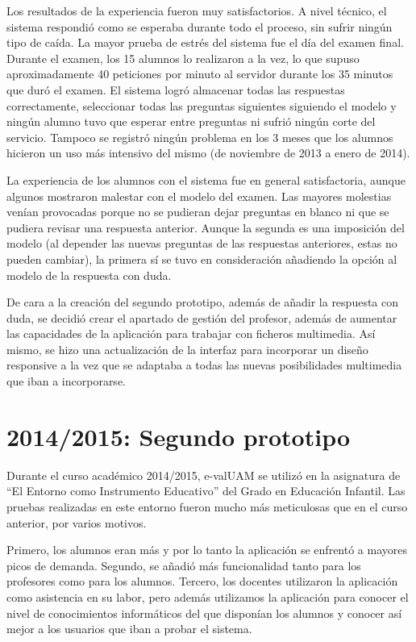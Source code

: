 Los resultados de la experiencia fueron muy satisfactorios. A nivel técnico, el sistema respondió como se esperaba durante todo el proceso, sin sufrir ningún tipo de caída. La mayor prueba de estrés del sistema fue el día del examen final. Durante el examen, los 15 alumnos lo realizaron a la vez, lo que supuso aproximadamente 40 peticiones por minuto al servidor durante los 35 minutos que duró el examen. El sistema logró almacenar todas las respuestas correctamente, seleccionar todas las preguntas siguientes siguiendo el modelo y ningún alumno tuvo que esperar entre preguntas ni sufrió ningún corte del servicio. Tampoco se registró ningún problema en los 3 meses que los alumnos hicieron un uso más intensivo del mismo (de noviembre de 2013 a enero de 2014).

La experiencia de los alumnos con el sistema fue en general satisfactoria, aunque algunos mostraron malestar con el modelo del examen. Las mayores molestias venían provocadas porque no se pudieran dejar preguntas en blanco ni que se pudiera revisar una respuesta anterior. Aunque la segunda es una imposición del modelo (al depender las nuevas preguntas de las respuestas anteriores, estas no pueden cambiar), la primera sí se tuvo en consideración añadiendo la opción al modelo de la respuesta con duda.

De cara a la creación del segundo prototipo, además de añadir la respuesta con duda, se decidió crear el apartado de gestión del profesor, además de aumentar las capacidades de la aplicación para trabajar con ficheros multimedia. Así mismo, se hizo una actualización de la interfaz para incorporar un diseño responsive a la vez que se adaptaba a todas las nuevas posibilidades multimedia que iban a incorporarse.

\section{2014/2015: Segundo prototipo}

Durante el curso académico 2014/2015, e-valUAM se utilizó en la asignatura de ``El Entorno como Instrumento Educativo'' del Grado en Educación Infantil. Las pruebas realizadas en este entorno fueron mucho más meticulosas que en el curso anterior, por varios motivos. 

Primero, los alumnos eran más y por lo tanto la aplicación se enfrentó a mayores picos de demanda. Segundo, se añadió más funcionalidad tanto para los profesores como para los alumnos. Tercero, los docentes utilizaron la aplicación como asistencia en su labor, pero además utilizamos la aplicación para conocer el nivel de conocimientos informáticos del que disponían los alumnos y conocer así mejor a los usuarios que iban a probar el sistema.

